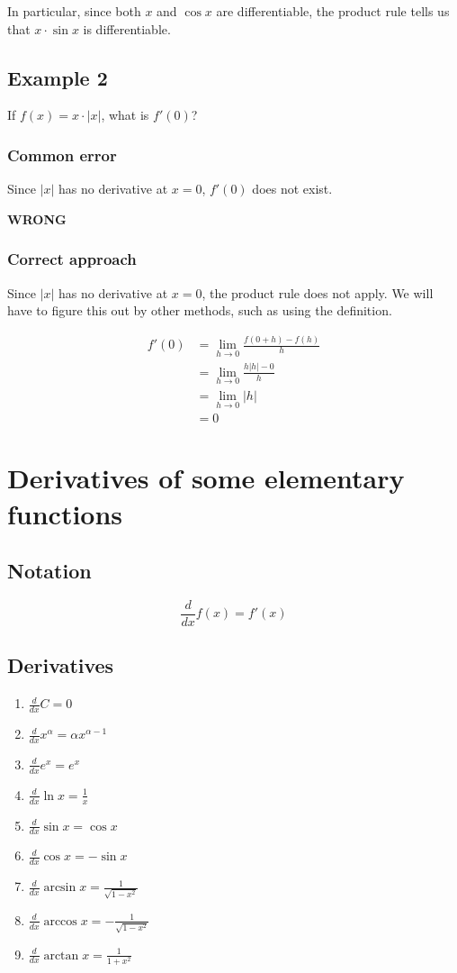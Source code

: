 \documentclass[11pt]{article}
\begin{document}
In particular, since both \(x\) and \(\cos x\) are differentiable, the product rule tells us that \(x \cdot \sin x\) is differentiable.
\subsection{Example 2}
\label{sec:org2e41242}
If \(f(x) = x \cdot |x|\), what is \(f'(0)\)?
\subsubsection{Common error}
\label{sec:orgfcbffa1}
Since \(|x|\) has no derivative at \(x = 0\), \(f'(0)\) does not exist.


\textbf{WRONG}
\subsubsection{Correct approach}
\label{sec:org768367c}
Since \(|x|\) has no derivative at \(x = 0\), the product rule does not apply. We will have to figure this out by other methods, such as using the definition.

\begin{align*}
f'(0) &= \lim_{h \rightarrow 0} \frac{f(0 + h) - f(h)}{h} \\
&= \lim_{h \rightarrow 0} \frac{h|h| - 0}{h} \\
&= \lim_{h \rightarrow 0} |h| \\
&= 0
\end{align*}

\newpage
\section{Derivatives of some elementary functions}
\label{sec:org6c82dd8}

\subsection{Notation}
\label{sec:orgda9911a}
\[\frac{d}{dx} f(x) = f'(x)\]
\subsection{Derivatives}
\label{sec:orgf6ec2da}
\begin{enumerate}
\item \(\frac{d}{dx} C = 0\)
\item \(\frac{d}{dx} x^{\alpha} = \alpha x^{\alpha - 1}\)
\item \(\frac{d}{dx} e^x = e^x\)
\item \(\frac{d}{dx} \ln x = \frac{1}{x}\)
\item \(\frac{d}{dx} \sin x = \cos x\)
\item \(\frac{d}{dx} \cos x = - \sin x\)
\item \(\frac{d}{dx} \arcsin x = \frac{1}{\sqrt{1 - x^2}}\)
\item \(\frac{d}{dx} \arccos x = - \frac{1}{\sqrt{1 - x^2}}\)
\item \(\frac{d}{dx} \arctan x = \frac{1}{1 + x^2}\)
\end{enumerate}
\end{document}
